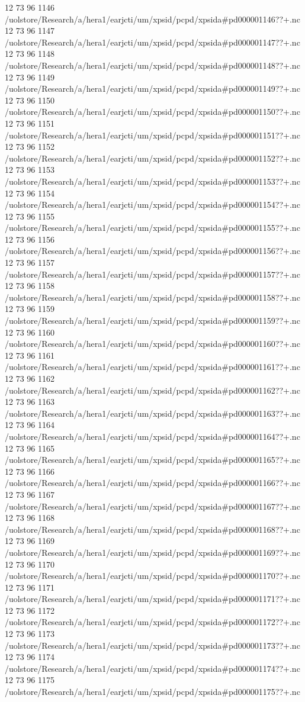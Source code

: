 12 73 96
1146
/uolstore/Research/a/hera1/earjcti/um/xpsid/pcpd/xpsida#pd000001146??+.nc
12 73 96
1147
/uolstore/Research/a/hera1/earjcti/um/xpsid/pcpd/xpsida#pd000001147??+.nc
12 73 96
1148
/uolstore/Research/a/hera1/earjcti/um/xpsid/pcpd/xpsida#pd000001148??+.nc
12 73 96
1149
/uolstore/Research/a/hera1/earjcti/um/xpsid/pcpd/xpsida#pd000001149??+.nc
12 73 96
1150
/uolstore/Research/a/hera1/earjcti/um/xpsid/pcpd/xpsida#pd000001150??+.nc
12 73 96
1151
/uolstore/Research/a/hera1/earjcti/um/xpsid/pcpd/xpsida#pd000001151??+.nc
12 73 96
1152
/uolstore/Research/a/hera1/earjcti/um/xpsid/pcpd/xpsida#pd000001152??+.nc
12 73 96
1153
/uolstore/Research/a/hera1/earjcti/um/xpsid/pcpd/xpsida#pd000001153??+.nc
12 73 96
1154
/uolstore/Research/a/hera1/earjcti/um/xpsid/pcpd/xpsida#pd000001154??+.nc
12 73 96
1155
/uolstore/Research/a/hera1/earjcti/um/xpsid/pcpd/xpsida#pd000001155??+.nc
12 73 96
1156
/uolstore/Research/a/hera1/earjcti/um/xpsid/pcpd/xpsida#pd000001156??+.nc
12 73 96
1157
/uolstore/Research/a/hera1/earjcti/um/xpsid/pcpd/xpsida#pd000001157??+.nc
12 73 96
1158
/uolstore/Research/a/hera1/earjcti/um/xpsid/pcpd/xpsida#pd000001158??+.nc
12 73 96
1159
/uolstore/Research/a/hera1/earjcti/um/xpsid/pcpd/xpsida#pd000001159??+.nc
12 73 96
1160
/uolstore/Research/a/hera1/earjcti/um/xpsid/pcpd/xpsida#pd000001160??+.nc
12 73 96
1161
/uolstore/Research/a/hera1/earjcti/um/xpsid/pcpd/xpsida#pd000001161??+.nc
12 73 96
1162
/uolstore/Research/a/hera1/earjcti/um/xpsid/pcpd/xpsida#pd000001162??+.nc
12 73 96
1163
/uolstore/Research/a/hera1/earjcti/um/xpsid/pcpd/xpsida#pd000001163??+.nc
12 73 96
1164
/uolstore/Research/a/hera1/earjcti/um/xpsid/pcpd/xpsida#pd000001164??+.nc
12 73 96
1165
/uolstore/Research/a/hera1/earjcti/um/xpsid/pcpd/xpsida#pd000001165??+.nc
12 73 96
1166
/uolstore/Research/a/hera1/earjcti/um/xpsid/pcpd/xpsida#pd000001166??+.nc
12 73 96
1167
/uolstore/Research/a/hera1/earjcti/um/xpsid/pcpd/xpsida#pd000001167??+.nc
12 73 96
1168
/uolstore/Research/a/hera1/earjcti/um/xpsid/pcpd/xpsida#pd000001168??+.nc
12 73 96
1169
/uolstore/Research/a/hera1/earjcti/um/xpsid/pcpd/xpsida#pd000001169??+.nc
12 73 96
1170
/uolstore/Research/a/hera1/earjcti/um/xpsid/pcpd/xpsida#pd000001170??+.nc
12 73 96
1171
/uolstore/Research/a/hera1/earjcti/um/xpsid/pcpd/xpsida#pd000001171??+.nc
12 73 96
1172
/uolstore/Research/a/hera1/earjcti/um/xpsid/pcpd/xpsida#pd000001172??+.nc
12 73 96
1173
/uolstore/Research/a/hera1/earjcti/um/xpsid/pcpd/xpsida#pd000001173??+.nc
12 73 96
1174
/uolstore/Research/a/hera1/earjcti/um/xpsid/pcpd/xpsida#pd000001174??+.nc
12 73 96
1175
/uolstore/Research/a/hera1/earjcti/um/xpsid/pcpd/xpsida#pd000001175??+.nc
